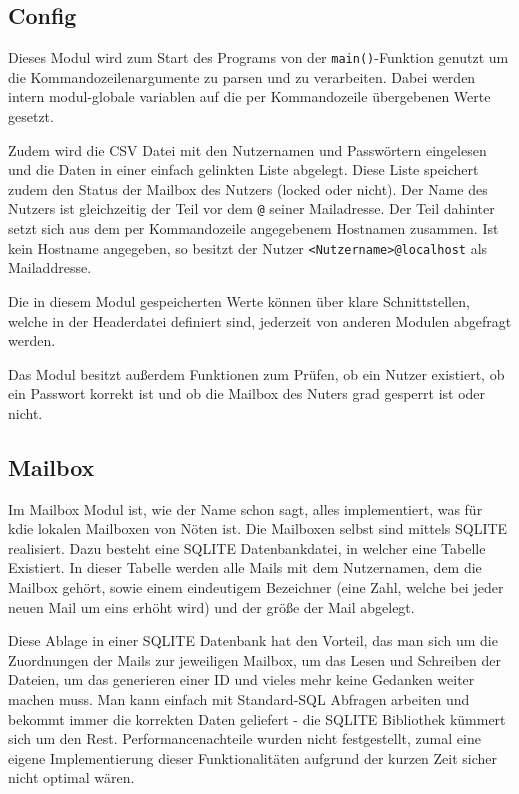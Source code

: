 \documentclass[final,a4paper,11pt,notitlepage,halfparskip]{scrreprt}
\begin{document}
\subsection{Config}
Dieses Modul wird zum Start des Programs von der \texttt{main()}-Funktion
genutzt um die Kommandozeilenargumente zu parsen und zu verarbeiten. Dabei
werden intern modul-globale variablen auf die per Kommandozeile übergebenen
Werte gesetzt. 

Zudem wird die CSV Datei mit den Nutzernamen und Passwörtern eingelesen und die
Daten in einer einfach gelinkten Liste abgelegt. Diese Liste speichert zudem den
Status der Mailbox des Nutzers (locked oder nicht). Der Name des Nutzers ist
gleichzeitig der Teil vor dem \texttt{@} seiner Mailadresse. Der Teil dahinter
setzt sich aus dem per Kommandozeile angegebenem Hostnamen zusammen. Ist kein
Hostname angegeben, so besitzt der Nutzer \texttt{<Nutzername>@localhost} als
Mailaddresse.

Die in diesem Modul gespeicherten Werte können über klare Schnittstellen, welche
in der Headerdatei definiert sind, jederzeit von anderen Modulen abgefragt
werden.

Das Modul besitzt außerdem Funktionen zum Prüfen, ob ein Nutzer existiert, ob
ein Passwort korrekt ist und ob die Mailbox des Nuters grad gesperrt ist oder
nicht.


\subsection{Mailbox}
Im Mailbox Modul ist, wie der Name schon sagt, alles implementiert, was für kdie
lokalen Mailboxen von Nöten ist. Die Mailboxen selbst sind mittels SQLITE
realisiert. Dazu besteht eine SQLITE Datenbankdatei, in welcher eine Tabelle
Existiert. In dieser Tabelle werden alle Mails mit dem Nutzernamen, dem die
Mailbox gehört, sowie einem eindeutigem Bezeichner (eine Zahl, welche bei jeder
neuen Mail um eins erhöht wird) und der größe der Mail abgelegt.

Diese Ablage in einer SQLITE Datenbank hat den Vorteil, das man sich um die
Zuordnungen der Mails zur jeweiligen Mailbox, um das Lesen und Schreiben der
Dateien, um das generieren einer ID und vieles mehr keine Gedanken weiter machen
muss. Man kann einfach mit Standard-SQL Abfragen arbeiten und bekommt immer die
korrekten Daten geliefert - die SQLITE Bibliothek kümmert sich um den Rest.
Performancenachteile wurden nicht festgestellt, zumal eine eigene
Implementierung dieser Funktionalitäten aufgrund der kurzen Zeit sicher nicht
optimal wären.
\end{document}
